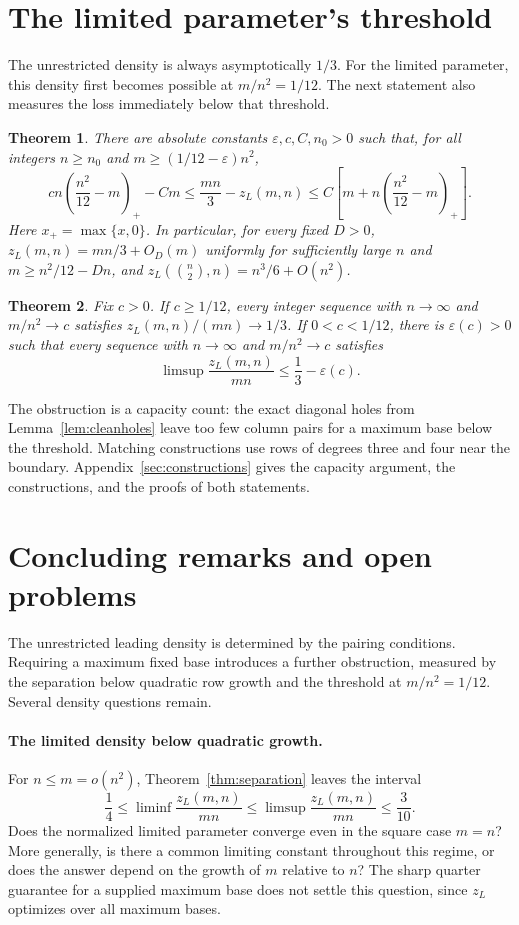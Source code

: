 \documentclass[11pt]{article}
\newtheorem{theorem}{Theorem}
\newcommand{\zl}{z_L}
\begin{document}
\section{The limited parameter's threshold}\label{sec:threshold}
The unrestricted density is always asymptotically $1/3$. For the limited
parameter, this density first becomes possible at $m/n^2=1/12$.
The next statement also measures the loss immediately below that threshold.

\begin{theorem}\label{thm:sharpasymptotic}
There are absolute constants $\varepsilon,c,C,n_0>0$ such that, for all
integers $n\ge n_0$ and $m\ge(1/12-\varepsilon)n^2$,
\[
 c n\left(\frac{n^2}{12}-m\right)_+-Cm
 \le\frac{mn}{3}-\zl(m,n)
 \le C\left[m+n\left(\frac{n^2}{12}-m\right)_+\right].
\]
Here $x_+=\max\{x,0\}$. In particular, for every fixed $D>0$,
$\zl(m,n)=mn/3+O_D(m)$ uniformly for sufficiently large $n$ and
$m\ge n^2/12-Dn$, and $\zl(\binom n2,n)=n^3/6+O(n^2)$.
\end{theorem}

\begin{theorem}\label{thm:threshold}
Fix $c>0$. If $c\ge1/12$, every integer sequence with
$n\to\infty$ and $m/n^2\to c$ satisfies
$\zl(m,n)/(mn)\to1/3$.
If $0<c<1/12$, there is $\varepsilon(c)>0$ such that every
sequence with $n\to\infty$ and $m/n^2\to c$ satisfies
\[
 \limsup\frac{\zl(m,n)}{mn}\le\frac13-\varepsilon(c).
\]
\end{theorem}

The obstruction is a capacity count: the exact diagonal holes from
Lemma~\ref{lem:cleanholes} leave too few column pairs for a maximum base
below the threshold. Matching constructions use rows of degrees three
and four near the boundary. Appendix~\ref{sec:constructions} gives the
capacity argument, the constructions, and the proofs of both statements.

\section{Concluding remarks and open problems}\label{sec:openproblems}
The unrestricted leading density is determined by the pairing conditions.
Requiring a maximum fixed base introduces a further obstruction, measured
by the separation below quadratic row growth and the threshold at
$m/n^2=1/12$. Several density questions remain.

\paragraph{The limited density below quadratic growth.}
For $n\le m=o(n^2)$, Theorem~\ref{thm:separation} leaves the interval
\[
 \frac14\le\liminf\frac{\zl(m,n)}{mn}
 \le\limsup\frac{\zl(m,n)}{mn}\le\frac3{10}.
\]
Does the normalized limited parameter converge even in the square case
$m=n$? More generally, is there a common limiting constant throughout
this regime, or does the answer depend on the growth of $m$ relative
to $n$? The sharp quarter guarantee for a supplied maximum base does
not settle this question, since $\zl$ optimizes over all maximum bases.
\end{document}
